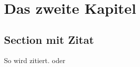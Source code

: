 \chapter{Das zweite Kapitel}
\blindtext
\clearpage

\section{Section mit Zitat}
So wird zitiert. \cite{Beck.2003} oder \citep{Beck.2003}